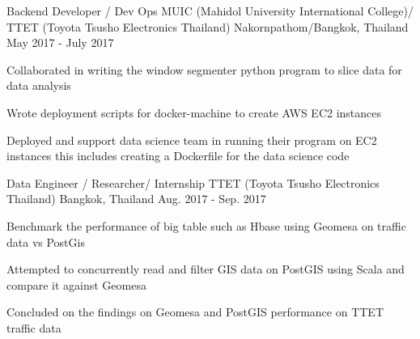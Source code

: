 

\begin{cventries}


  \cventry
    {Backend Developer / Dev Ops} %
    {MUIC (Mahidol University International College)/ TTET (Toyota Tsusho Electronics Thailand)} %
    {Nakornpathom/Bangkok, Thailand} %
    {May 2017 - July 2017} %
    {
      \begin{cvitems} %
        \item {Collaborated in writing the window segmenter python program to slice data for data analysis}
        \item {Wrote deployment scripts for docker-machine to create AWS EC2 instances}
        \item {Deployed and support data science team in running their program on EC2 instances this includes creating a Dockerfile for the data science code}
      \end{cvitems}
    }

  \cventry
    {Data Engineer / Researcher/ Internship} %
    {TTET (Toyota Tsusho Electronics Thailand)} %
    {Bangkok, Thailand} %
    {Aug. 2017 - Sep. 2017} %
    {
      \begin{cvitems} %
        \item {Benchmark the performance of big table such as Hbase using Geomesa on traffic data vs PostGis}
        \item {Attempted to concurrently read and filter GIS data on PostGIS using Scala and compare it against Geomesa}
        \item {Concluded on the findings on Geomesa and PostGIS performance on TTET traffic data}
      \end{cvitems}
    }


\end{cventries}

